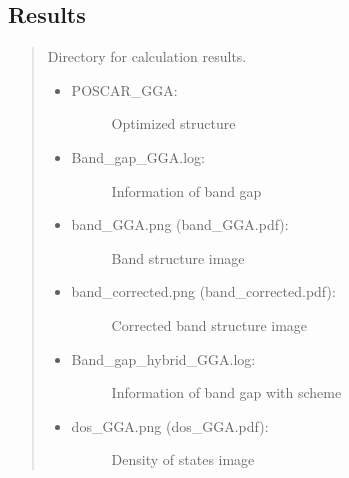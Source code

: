 \documentclass[letterpaper,10pt,english]{sphinxmanual}
\begin{document}
\subsection{Results}
\label{\detokenize{Output/Output:results}}\begin{quote}

Directory for calculation results.
\begin{itemize}
\item {} \begin{description}
\item[{POSCAR\_GGA:}] \leavevmode
Optimized structure

\end{description}

\item {} \begin{description}
\item[{Band\_gap\_GGA.log:}] \leavevmode
Information of band gap

\end{description}

\item {} \begin{description}
\item[{band\_GGA.png (band\_GGA.pdf):}] \leavevmode
Band structure image

\end{description}

\item {} \begin{description}
\item[{band\_corrected.png (band\_corrected.pdf):}] \leavevmode
Corrected band structure image

\end{description}

\item {} \begin{description}
\item[{Band\_gap\_hybrid\_GGA.log:}] \leavevmode
Information of band gap with  scheme

\end{description}

\item {} \begin{description}
\item[{dos\_GGA.png (dos\_GGA.pdf):}] \leavevmode
Density of states image

\end{description}


\end{itemize}
\end{quote}
\end{document}
